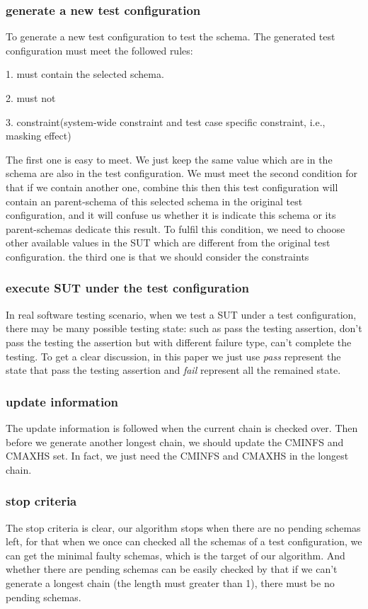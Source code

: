 \documentclass[10pt,journal,cspaper,compsoc]{IEEEtran}
\begin{document}
\subsubsection{generate a new test configuration}
To generate a new test configuration to test the schema. The generated test configuration must meet the followed rules:

1. must contain the selected schema.

2. must not

3. constraint(system-wide constraint and test case specific constraint, i.e., masking effect)

The first one is easy to meet. We just keep the same value which are in the schema are also in the test configuration.
We must meet the second condition for that if we contain another one, combine this then this test configuration will contain an parent-schema of this selected schema in the original test configuration, and it will confuse us whether it is indicate this schema or its parent-schemas dedicate this result. To fulfil this condition, we need to choose other available values in the SUT which are different from the original test configuration.
the third one is that we should consider the constraints

\subsubsection{execute SUT under the test configuration}
In real software testing scenario, when we test a SUT under a test configuration, there may be many possible testing state: such as pass the testing assertion, don't pass the testing the assertion but with different failure type, can't complete the testing. To get a clear discussion, in this paper we just use \emph{pass} represent the state that pass the testing assertion and \emph{fail} represent all the remained state.

\subsubsection{update information}
The update information is followed when the current chain is checked over. Then before we generate another longest chain, we should update the CMINFS and CMAXHS set. In fact, we just need the CMINFS and CMAXHS in the longest chain.

\subsubsection{stop criteria}
The stop criteria is clear, our algorithm stops when there are no pending schemas left, for that when we once can checked all the schemas of a test configuration, we can get the minimal faulty schemas, which is the target of our algorithm. And whether there are pending schemas can be easily checked by that if we can't generate a longest chain (the length must greater than 1), there must be no pending schemas.
\end{document}
